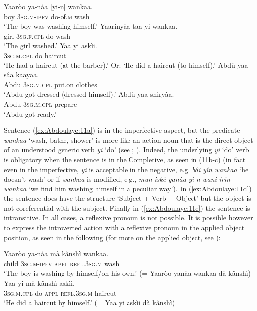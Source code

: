 \documentclass[output=paper]{langscibook}
\begin{document}
\ea%
    \label{ex:Abdoulaye:11}
    \ea \label{ex:Abdoulaye:11a}
    \gll Yaaròo  ya-nàa  [yi-n]  wankaa.\\
    boy  \textsc{3sg.m-ipfv}  do-of.\textsc{m}  wash\\
    \glt `The boy was washing himself.’
    \ex \label{ex:Abdoulaye:11b}
     \gll Yaarinyàa  taa  yi  wankaa.\\
    girl  \textsc{3sg.f.cpl}  do  wash\\
    \glt `The girl washed.’
    \ex \label{ex:Abdoulaye:11c}
    \gll Yaa  yi  askìi.\\
    \textsc{3sg.m.cpl}  do  haircut\\
    \glt `He had a haircut (at the barber).’ Or: ‘He did a haircut (to himself).’
    \ex \label{ex:Abdoulaye:11d}
     \gll    Abdù  yaa  sâa  kaayaa.\\
    Abdu  \textsc{3sg.m.cpl}  put.on  clothes\\
    \glt `Abdu got dressed (dressed himself).’
    \ex \label{ex:Abdoulaye:11e}
     \gll Abdù  yaa  shiryàa.\\
    Abdu  \textsc{3sg.m.cpl}  prepare\\
    \glt `Abdu got ready.’
    \z
\z
    


Sentence (\ref{ex:Abdoulaye:11a}) is in the imperfective aspect, but the predicate \textit{wankaa} ‘wash, bathe, shower’ is more like an action noun that is the direct object of an understood generic verb \textit{yi} ‘do’ (see \citealt[281]{Newman2000}; \citealt[171]{Jaggar2001}). Indeed, the underlying \textit{yi} ‘do’ verb is obligatory when the sentence is in the Completive, as seen in (11b\nobreakdash-c) (in fact even in the imperfective, \textit{yi} is acceptable in the negative, e.g. \textit{bâi} \textit{yîn} \textit{wankaa} ‘he doesn’t wash’ or if \textit{wankaa} is modified, e.g., \textit{mun} \textit{iskè} \textit{yanàa} \textit{yî\nobreakdash-n} \textit{wani} \textit{irìn} \textit{wankaa} ‘we find him washing himself in a peculiar way’). In (\ref{ex:Abdoulaye:11d}) the sentence does have the structure ‘Subject + Verb + Object’ but the object is not coreferential with the subject. Finally in (\ref{ex:Abdoulaye:11e}) the sentence is intransitive. In all cases, a reflexive pronoun is not possible. It is possible however to express the introverted action with a reflexive pronoun in the applied object position, as seen in the following (for more on the applied object, see ):

\ea%
    \label{ex:Abdoulaye:12}
    \ea \label{ex:Abdoulaye:12a}
    \gll  Yaaròo  ya-nàa  mà  kânshì  wankaa. \\
    child  \textsc{3sg.m-ipfv}  \textsc{appl}  \textsc{refl.3sg.m}  wash\\
    \glt `The boy is washing by himself/on his own.’ (= Yaaròo yanàa wankaa dà kânshì)
    \ex \label{ex:Abdoulaye:12b}
    \gll Yaa  yi  mà  kânshì  askìi. \\
    \textsc{3sg.m.cpl}  do  \textsc{appl}  \textsc{refl.3sg.m}  haircut\\
    \glt `He did a haircut by himself.’ (=  Yaa yi askìi dà kânshì)
    \z
\z
\end{document}
